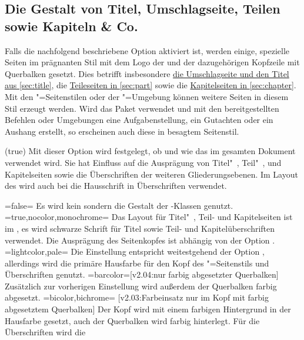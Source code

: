 \begin{DeclareEntity*}{}
\begin{DeclareEntity*}{}
\begin{DeclareEntity*}{}
\subsection{%
  Die Gestalt von Titel, Umschlagseite, Teilen sowie Kapiteln \& Co.%
}
%
Falls die nachfolgend beschriebene Option  aktiviert ist, 
werden einige, spezielle Seiten im prägnanten Stil mit dem Logo der \TnUD und 
der dazugehörigen Kopfzeile mit Querbalken gesetzt. Dies betrifft insbesondere 
\hyperref[sec:title]{die Umschlagseite und den Titel aus \autoref*{sec:title}}, 
die \hyperref[sec:part]{Teileseiten in \autoref*{sec:part}} sowie die
\hyperref[sec:chapter]{Kapitelseiten in \autoref*{sec:chapter}}. Mit den 
"=Seitenstilen oder der "=Umgebung 
können weitere Seiten in diesem Stil erzeugt werden. Wird das Paket 
 verwendet und mit den bereitgestellten Befehlen oder 
Umgebungen eine Aufgabenstellung, ein Gutachten oder ein Aushang erstellt, so 
erscheinen auch diese in besagtem Seitenstil.
%
\begin{Declaration}
  {}
  (true)
\printdeclarationlist
%
Mit dieser Option wird festgelegt, ob und wie das \TUDCD im gesamten Dokument 
verwendet wird. Sie hat Einfluss auf die Ausprägung von Titel"~, Teil"~, und 
Kapitelseiten sowie die Überschriften der weiteren Gliederungsebenen. 
Im Layout des \CDs wird auch bei  die Hausschrift in 
Überschriften verwendet.
%
\begin{DeclareValues}
\itemval=false=
  Es wird kein \CD sondern die Gestalt der \KOMAScript-Klassen genutzt.
\itemval*=true,nocolor,monochrome=
  Das Layout für Titel"~, Teil- und Kapitelseiten ist im \CD, es wird 
  schwarze Schrift für Titel sowie Teil- und Kapitelüberschriften verwendet.
  Die Ausprägung des Seitenkopfes ist abhängig von der Option .
\itemval=lightcolor,pale=
  Die Einstellung entspricht weitestgehend der Option , 
  allerdings wird die primäre Hausfarbe  für den Kopf des 
  "=Seitenstils und Überschriften genutzt.
\itemval=barcolor=[v2.04:nur farbig abgesetzter Querbalken]
  Zusätzlich zur vorherigen Einstellung wird außerdem der Querbalken farbig 
  abgesetzt.
\itemval=bicolor,bichrome=%
    [v2.03:Farbeinsatz nur im Kopf mit farbig abgesetztem Querbalken]
  Der Kopf wird mit einem farbigen Hintergrund in der Hausfarbe gesetzt, auch 
  der Querbalken wird farbig hinterlegt. Für die Überschriften wird die 

\end{DeclareValues}
\end{Declaration}
\end{DeclareEntity*}
\end{DeclareEntity*}
\end{DeclareEntity*}
